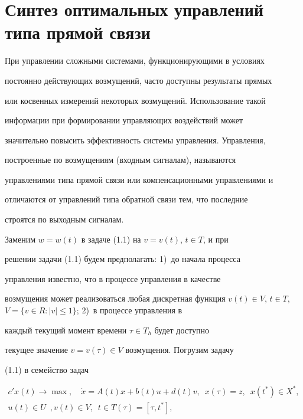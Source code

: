 \section{Синтез оптимальных управлений типа прямой связи}





При управлении сложными системами, функционирующими в условиях


постоянно действующих возмущений, часто доступны результаты прямых


или косвенных измерений некоторых возмущений. Использование такой


информации при формировании управляющих воздействий может


значительно повысить эффективность системы управления. Управления,


построенные по возмущениям (входным сигналам), называются


управлениями типа прямой связи или компенсационными управлениями и


отличаются от управлений типа обратной связи тем, что последние


строятся по выходным сигналам.





Заменим $w=w(t)$ в задаче (1.1) на $v=v(t)$, $t \in T$, и при


решении задачи (1.1) будем предполагать: 1)~до начала процесса


управления известно, что в процессе управления в качестве


возмущения может реализоваться любая дискретная функция $v(t) \in


V$, $t \in T$, $V=\{v \in R:|v| \le 1 \}$; 2)~в процессе управления в


каждый текущий момент времени $\tau \in T_h$ будет доступно


текущее значение $v=v(\tau) \in V $ возмущения. Погрузим задачу


(1.1) в семейство задач


\begin{gather*}


c'x(t) \rightarrow \max,\quad \Dot x=A(t)x+b(t)u+d(t)v,\ \; x(\tau)=z,


\ \; x(t^*) \in X^*,\\


u(t) \in U\ \;, v(t) \in V,\ \; t \in T(\tau)=[\tau, t^*],


\end{gather*}


